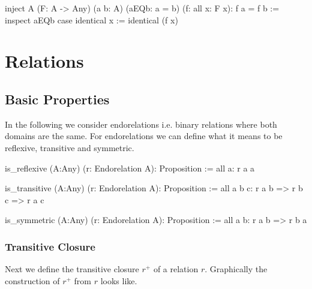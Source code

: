 \begin{alba}
    inject
        A (F: A -> Any)
        (a b: A)
        (aEQb: a = b)
        (f: all x: F x):
        f a = f b
    :=
        inspect aEQb case
            identical x := identical (f x)
\end{alba}








\newpage


\section{Relations}
\label{sec:certprog-relations}


\subsection{Basic Properties}


In the following we consider endorelations i.e. binary relations where both
domains are the same. For endorelations we can define what it means to be
reflexive, transitive and symmetric.

\begin{alba}
  is_reflexive (A:Any) (r: Endorelation A): Proposition :=
    all a: r a a

  is_transitive (A:Any) (r: Endorelation A): Proposition :=
    all a b c: r a b => r b c => r a c

  is_symmetric (A:Any) (r: Endorelation A): Proposition :=
    all a b: r a b => r b a
\end{alba}



\subsubsection{Transitive Closure}

Next we define the transitive closure $r^+$ of a relation $r$. Graphically the
construction of $r^+$ from $r$ looks like.



